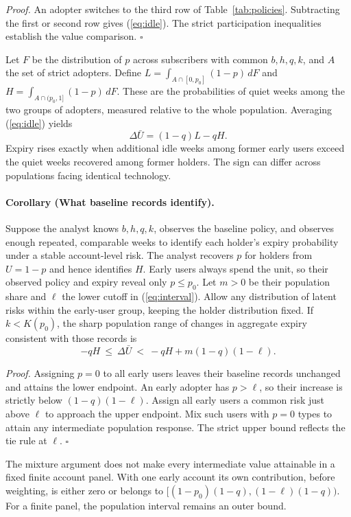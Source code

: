 \documentclass[11pt]{article}
\begin{document}
\emph{Proof.} An adopter switches to the third row of Table~\ref{tab:policies}. Subtracting the first or second row gives (\ref{eq:idle}). The strict participation inequalities establish the value comparison. \hfill$\square$

Let $F$ be the distribution of $p$ across subscribers with common $b,h,q,k$, and $A$ the set of strict adopters. Define $L=\int_{A\cap[0,p_0]}(1-p)\,dF$ and $H=\int_{A\cap(p_0,1]}(1-p)\,dF$. These are the probabilities of quiet weeks among the two groups of adopters, measured relative to the whole population. Averaging (\ref{eq:idle}) yields
\[
  \Delta\bar U=(1-q)L-qH.
\]
Expiry rises exactly when additional idle weeks among former early users exceed the quiet weeks recovered among former holders. The sign can differ across populations facing identical technology.

\paragraph{Corollary (What baseline records identify).}
Suppose the analyst knows $b,h,q,k$, observes the baseline policy, and observes enough repeated, comparable weeks to identify each holder's expiry probability under a stable account-level risk. The analyst recovers $p$ for holders from $U=1-p$ and hence identifies $H$. Early users always spend the unit, so their observed policy and expiry reveal only $p\le p_0$. Let $m>0$ be their population share and $\ell$ the lower cutoff in (\ref{eq:interval}). Allow any distribution of latent risks within the early-user group, keeping the holder distribution fixed. If $k<K(p_0)$, the sharp population range of changes in aggregate expiry consistent with those records is
\begin{equation}
  -qH \ \le\ \Delta\bar U\ <\ -qH+m(1-q)(1-\ell).
  \label{eq:bounds}
\end{equation}

\emph{Proof.} Assigning $p=0$ to all early users leaves their baseline records unchanged and attains the lower endpoint. An early adopter has $p>\ell$, so their increase is strictly below $(1-q)(1-\ell)$. Assign all early users a common risk just above $\ell$ to approach the upper endpoint. Mix such users with $p=0$ types to attain any intermediate population response. The strict upper bound reflects the tie rule at $\ell$. \hfill$\square$

The mixture argument does not make every intermediate value attainable in a fixed finite account panel. With one early account its own contribution, before weighting, is either zero or belongs to $[(1-p_0)(1-q),(1-\ell)(1-q))$. For a finite panel, the population interval remains an outer bound.
\end{document}
